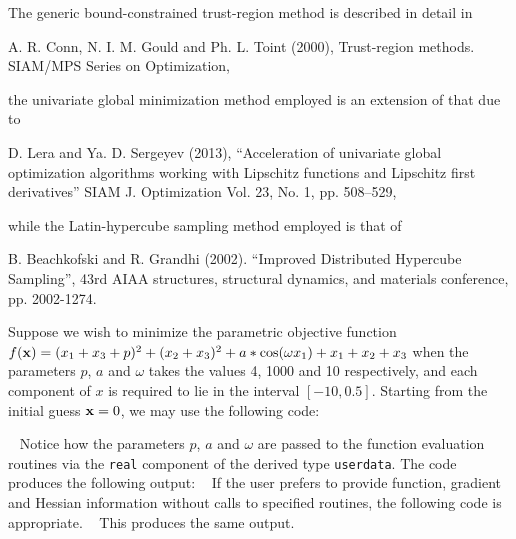 \documentclass{galahad}
\begin{document}
\galreferences
\vspace*{1mm}

\noindent
The generic bound-constrained trust-region method is described in detail in
\vspace*{1mm}

\noindent
A. R. Conn, N. I. M. Gould and Ph. L. Toint (2000),
Trust-region methods.
SIAM/MPS Series on Optimization,

\noindent
the univariate global minimization method employed is an extension of that
due to
\vspace*{1mm}

\noindent
D. Lera and Ya. D. Sergeyev (2013),
``Acceleration of univariate global optimization algorithms working with
Lipschitz functions and Lipschitz first derivatives''
SIAM J. Optimization Vol. 23, No. 1, pp. 508–529,

\noindent
while the Latin-hypercube sampling method employed is that of
\vspace*{1mm}

\noindent
B. Beachkofski and R. Grandhi (2002).
``Improved Distributed Hypercube Sampling'',
43rd AIAA structures, structural dynamics, and materials conference,
pp. 2002-1274.


\galexamples
Suppose we wish to minimize the parametric objective function
$f({\mathbf{x}}) = ( x_1 + x_3 + p )^2 + ( x_2 + x_3 )^2 + a * \cos( \omega x_1 ) +
x_1 + x_2 + x_3$
when the parameters $p$, $a$ and $\omega$ takes the values 4, 1000 and 10
respectively, and each component of $x$ is required to lie in the interval
$[-10,0.5]$.
Starting from the initial guess ${\mathbf{x}} = 0$, we may use the following code:

{\tt \small
\VerbatimInput{\packageexample}
}
\noindent
Notice how the parameters $p$, $a$ and $\omega$ are passed to the function
evaluation routines via the {\tt real} component of the derived type
{\tt userdata}.
The code produces the following output:
{\tt \small
\VerbatimInput{\packageresults}
}
\noindent
If the user prefers to provide function, gradient and Hessian information
without calls to specified routines, the following code is appropriate.
{\tt \small
\VerbatimInput{\packageexampleb}
}
\noindent
This produces the same output.
\end{document}

